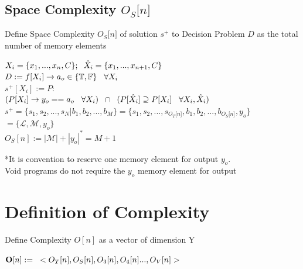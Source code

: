 \documentclass[11pt]{article}
\begin{document}
\subsection{Space Complexity $O_S \lbrack n \rbrack$}
Define Space Complexity $O_S \lbrack n \rbrack$ of solution $s^+$ to Decision Problem $D$ as the total number of memory elements
\begin{center}
\vspace{1mm}
$
X_i = \{x_1,...,x_n,C\}; \hspace{2mm} \hat{X}_i = \{x_1,...,x_{n+1},C\}
$
\\ \vspace{4mm}
$
D := f \lbrack X_i \rbrack \rightarrow a_{o} \in \{\mathbb{T}, \mathbb{F}\} \hspace{3mm} \forall X_i
$
\\ \vspace{4mm}
$
s^+[X_i] := P :
$
\\ \vspace{2mm}
$
(P \lbrack X_i \rbrack \rightarrow y_{o} == a_{o} \hspace{3mm} \forall X_i) \hspace{2mm} \cap \hspace{2mm} (P[\hat{X}_i] \supseteq P[X_i] \hspace{3mm} \forall X_i,\hat{X}_i)
$
\\ \vspace{4mm}
$
s^+ = \{ s_1,s_2,...,s_N|b_1,b_2,...,b_M\} = \{ s_1,s_2,...,s_{O_T \lbrack n \rbrack }, b_1, b_2,...,b_{O_S \lbrack n \rbrack},y_o \}
$
\\ \vspace{2mm}
$
= \{ \mathcal{L},\mathcal{M},y_o\}
$
\\ \vspace{3mm}
$
O_S[n] := |\mathcal{M}|+|y_o|^* = M + 1
$
\end{center}
\vspace{2mm}
*It is convention to reserve one memory element for output $y_o$.\\
Void programs do not require the $y_o$ memory element for output




\section{Definition of Complexity}
Define Complexity $O[n]$ as a vector of dimension Y
\begin{center}
$
\bold{O}[n] := \hspace{3mm} < O_T [n], O_S [n],O_3[n],O_4[n]...,O_V[n]>
$
\end{center}
\end{document}
